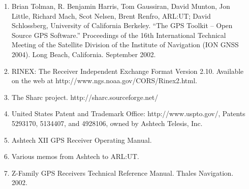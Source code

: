 \begin{enumerate}

  \item Brian Tolman, R. Benjamin Harris, Tom Gaussiran, David Munton, Jon Little, Richard Mach, Scot Nelsen, Brent Renfro, ARL:UT; David Schlossberg, University of California Berkeley. ``The GPS Toolkit -- Open Source GPS Software.'' Proceedings of the 16th International Technical Meeting of the Satellite Division of the Institute of Navigation (ION GNSS 2004). Long Beach, California. September 2002.

  \item RINEX: The Receiver Independent Exchange Format Version 2.10.
  Available on the web at http://www.ngs.noaa.gov/CORS/Rinex2.html.

  \item The Sharc project. http://sharc.sourceforge.net/

  \item United States Patent and Trademark Office: http://www.uspto.gov/, Patents 5293170, 5134407, and 4928106, owned by Ashtech Telesis, Inc.

  \item Ashtech XII GPS Receiver Operating Manual.
  
  \item Various memos from Ashtech to ARL:UT.

  \item Z-Family GPS Receivers Technical Reference Manual. Thales Navigation. 2002.
  
\end{enumerate}

